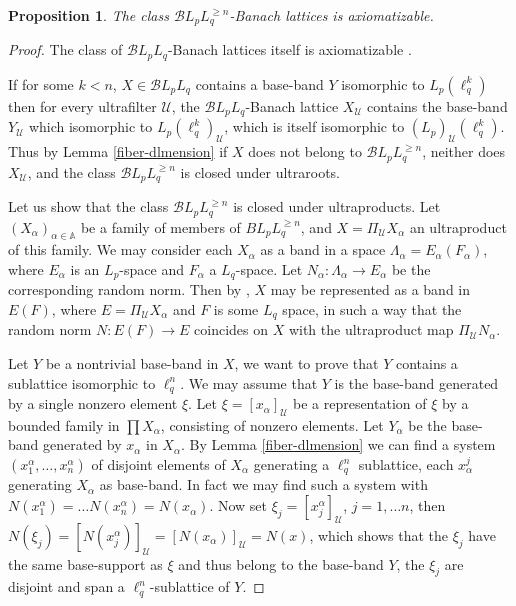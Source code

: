 \documentclass[11pt]{amsart}
\theoremstyle{plain}
\newtheorem{proposition}[theorem]{Proposition}
\theoremstyle{remark}
\newcommand{\U}{\mathcal U}
\begin{document}
\begin{proposition}\label{Axiomatizability}
The class $\mathcal BL_pL_q^{\ge n}$-Banach lattices is axiomatizable.
\end{proposition}

\begin{proof} 
The class  of $\mathcal BL_pL_q$-Banach lattices itself is axiomatizable  \cite{HR}.

If for some $k<n$, $X\in \mathcal BL_pL_q$ contains a base-band $Y$ isomorphic to $L_p(\ell_q^k)$ then for every ultrafilter $\U$, the $\mathcal BL_pL_q$-Banach lattice $X_\U$ contains the base-band $Y_\U$ which isomorphic to $L_p(\ell_q^k)_\U$, which is itself isomorphic to $(L_p)_\U(\ell_q^k)$. Thus by Lemma 
\ref{fiber-dlmension} if $X$ does not belong to $\mathcal BL_pL_q^{\ge n}$, neither does $X_\U$, and the class $\mathcal BL_pL_q^{\ge n}$ is closed under ultraroots.

Let us show that the class $\mathcal BL_pL_q^{\ge n}$ is closed under ultraproducts. Let $(X_\alpha)_{\alpha\in \mathbb A}$ be a family of members of  $BL_pL_q^{\ge n}$, and $X=\Pi_\U X_\alpha$ an ultraproduct of this family. We may consider each $X_\alpha$ as a band in a space $\Lambda_\alpha=E_\alpha(F_\alpha)$, where $E_\alpha$ is an $L_p$-space and $F_\alpha$ a $L_q$-space. Let  $N_\alpha:\Lambda_\alpha\to E_\alpha$ be the corresponding  random norm. Then by \cite{LR}, $X$ may be represented as a band in $E(F)$, where $E=\Pi_\U X_\alpha$ and $F$ is some $L_q$ space, in such a way that the random norm $N:E(F)\to E$ coincides on $X$ with the ultraproduct map $\Pi_\U N_\alpha$. 

Let $Y$ be a nontrivial base-band in $X$, we want to prove that $Y$ contains a sublattice isomorphic to $\ell_q^n$. We may assume that $Y$ is the base-band generated by a single nonzero element $\xi$. Let $\xi=[x_\alpha]_\U$ be a representation of $\xi$ by a bounded  family  in $\prod X_\alpha$, consisting of nonzero elements. Let $Y_\alpha$ be the base-band generated by $x_\alpha$ in $X_\alpha$. By Lemma \ref{fiber-dlmension} we can find a system $(x_1^\alpha,\dots , x_n^\alpha)$ of disjoint elements of $X_\alpha$ generating a $\ell_q^n$ sublattice, each $x^j_\alpha$ generating $X_\alpha$ as base-band. In fact we may find such a system with $N(x_1^\alpha)=\dots N(x_n^\alpha)=N(x_\alpha)$. 
Now set $\xi_j=[x_j^\alpha]_\U$, $j=1,\dots n$, then $N(\xi_j)=[N(x_j^\alpha)]_\U=[N(x_\alpha)]_\U=N(x)$, which shows that the $\xi_j$ have the same base-support as $\xi$ and thus belong to the base-band $Y$, the $\xi_j$ are disjoint and span a $\ell_q^n$-sublattice of $Y$.
 \end{proof}
 
\end{document}
